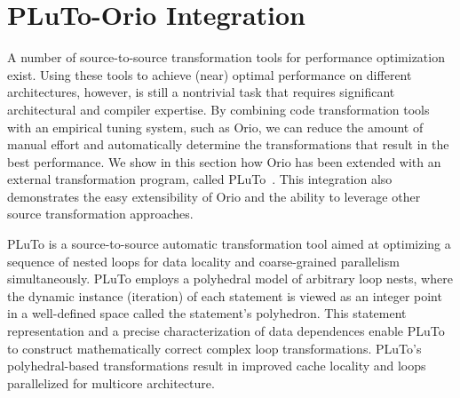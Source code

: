 \section{PLuTo-Orio Integration}
\label{sec:integration}

A number of source-to-source transformation tools for performance
optimization exist. Using these tools to achieve (near) optimal performance
on different architectures, however, is still a nontrivial task that requires
significant architectural and compiler expertise. By combining code
transformation tools with an empirical tuning system, such as Orio, we can
reduce the amount of manual effort and automatically determine the
transformations that result in the best performance. We show in this section
how Orio has been extended with an external transformation program, called
PLuTo~\cite{uday08pldi}. This integration also demonstrates the easy
extensibility of Orio and the ability to leverage other source transformation
approaches.

PLuTo is a source-to-source automatic transformation tool aimed at optimizing
a sequence of nested loops for data locality and coarse-grained parallelism
simultaneously. PLuTo employs a polyhedral model of arbitrary loop nests,
where the dynamic instance (iteration) of each statement is viewed as an
integer point in a well-defined space called the statement's polyhedron. This
statement representation and a precise characterization of data dependences
enable PLuTo to construct mathematically correct complex loop
transformations. PLuTo's polyhedral-based transformations result in improved
cache locality and loops parallelized for multicore architecture.

